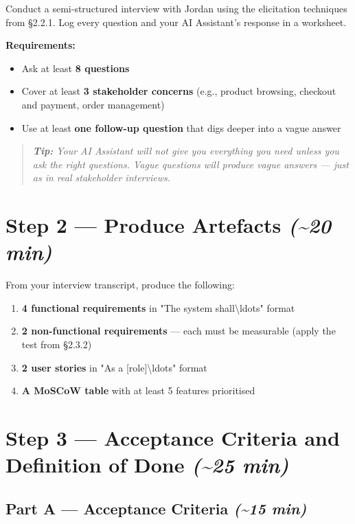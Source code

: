 \documentclass[11pt,a4paper]{book}
\begin{document}
Conduct a semi-structured interview with Jordan using the elicitation techniques from §2.2.1. Log every question and your AI Assistant's response in a worksheet.

\textbf{Requirements:}
\begin{itemize}
  \item Ask at least \textbf{8 questions}
  \item Cover at least \textbf{3 stakeholder concerns} (e.g., product browsing, checkout and payment, order management)
  \item Use at least \textbf{one follow-up question} that digs deeper into a vague answer
\end{itemize}

\begin{quote}
\textit{\textbf{Tip:} Your AI Assistant will not give you everything you need unless you ask the right questions. Vague questions will produce vague answers --- just as in real stakeholder interviews.}
\end{quote}

\medskip

\section{Step 2 --- Produce Artefacts \textit{(\textasciitilde{}20 min)}}

From your interview transcript, produce the following:

\begin{enumerate}
  \item \textbf{4 functional requirements} in "The system shall\textbackslash{}ldots{}" format
  \item \textbf{2 non-functional requirements} --- each must be measurable (apply the test from §2.3.2)
  \item \textbf{2 user stories} in "As a [role]\textbackslash{}ldots{}" format
  \item \textbf{A MoSCoW table} with at least 5 features prioritised
\end{enumerate}

\medskip

\section{Step 3 --- Acceptance Criteria and Definition of Done \textit{(\textasciitilde{}25 min)}}

\subsection{Part A --- Acceptance Criteria \textit{(\textasciitilde{}15 min)}}
\end{document}
